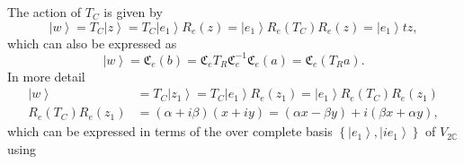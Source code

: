 \documentclass[aps,preprint]{revtex4}%
\begin{document}
The action of $T_{C}$ is given by
\begin{equation}
\left\vert w\right\rangle =T_{C}\left\vert z\right\rangle =T_{C}\left\vert
e_{1}\right\rangle R_{e}\left(  z\right)  =\left\vert e_{1}\right\rangle
R_{e}\left(  T_{C}\right)  R_{e}\left(  z\right)  =\left\vert e_{1}%
\right\rangle tz,
\end{equation}
which can also be expressed as
\begin{equation}
\left\vert w\right\rangle =\mathfrak{C}_{e}\left(  b\right)  =\mathfrak{C}%
_{e}T_{R}\mathfrak{C}_{e}^{-1}\mathfrak{C}_{e}\left(  a\right)  =\mathfrak{C}%
_{e}\left(  T_{R}a\right)  .
\end{equation}
In more detail%
\begin{align}
\left\vert w\right\rangle  &  =T_{C}\left\vert z_{1}\right\rangle
=T_{C}\left\vert e_{1}\right\rangle R_{e}\left(  z_{1}\right)  =\left\vert
e_{1}\right\rangle R_{e}\left(  T_{C}\right)  R_{e}\left(  z_{1}\right) \\
R_{e}\left(  T_{C}\right)  R_{e}\left(  z_{1}\right)   &  =\left(
\alpha+i\beta\right)  \left(  x+iy\right)  =\left(  \alpha x-\beta y\right)
+i\left(  \beta x+\alpha y\right)  ,
\end{align}
which can be expressed in terms of the over complete basis $\left\{
\left\vert e_{1}\right\rangle ,\left\vert ie_{1}\right\rangle \right\}  $ of
$V_{2\mathbb{C}}$ using
\end{document}

